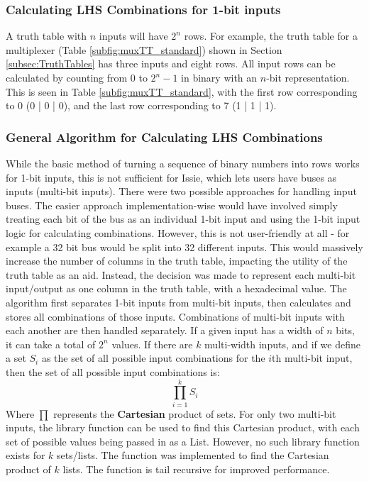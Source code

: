\subsubsection{Calculating LHS Combinations for 1-bit inputs}
A truth table with $n$ inputs will have $2^n$ rows. For example, the truth table for a multiplexer (Table \ref{subfig:muxTT_standard}) shown in Section \ref{subsec:TruthTables} has three inputs and eight rows. All input rows can be calculated by counting from $0$ to $2^n-1$ in binary with an $n$-bit representation. This is seen in Table \ref{subfig:muxTT_standard}, with the first row corresponding to 0 (0 | 0 | 0), and the last row corresponding to 7 (1 | 1 | 1).

\subsubsection{General Algorithm for Calculating LHS Combinations}
While the basic method of turning a sequence of binary numbers into rows works for 1-bit inputs, this is not sufficient for Issie, which lets users have buses as inputs (multi-bit inputs). There were two possible approaches for handling input buses. The easier approach implementation-wise would have involved simply treating each bit of the bus as an individual 1-bit input and using the 1-bit input logic for calculating combinations. However, this is not user-friendly at all - for example a 32 bit bus would be split into 32 different inputs. This would massively increase the number of columns in the truth table, impacting the utility of the truth table as an aid. Instead, the decision was made to represent each multi-bit input/output as one column in the truth table, with a hexadecimal value. 
The algorithm first separates 1-bit inputs from multi-bit inputs, then calculates and stores all combinations of those inputs. Combinations of multi-bit inputs with each another are then handled separately. If a given input has a width of $n$ bits, it can take a total of $2^n$ values. If there are $k$ multi-width inputs, and if we define a set $S_i$ as the set of all possible input combinations for the $i$th multi-bit input, then the set of all possible input combinations is:
\begin{equation}
    \prod_{i=1}^{k} S_i
\end{equation}
Where $\prod$ represents the \textbf{Cartesian} product of sets. For only two multi-bit inputs, the library function  \cite{ListFuns} can be used to find this Cartesian product, with each set of possible values being passed in as a List. However, no such library function exists for $k$ sets/lists. The function  was implemented to find the Cartesian product of $k$ lists. The function is tail recursive for improved performance.

